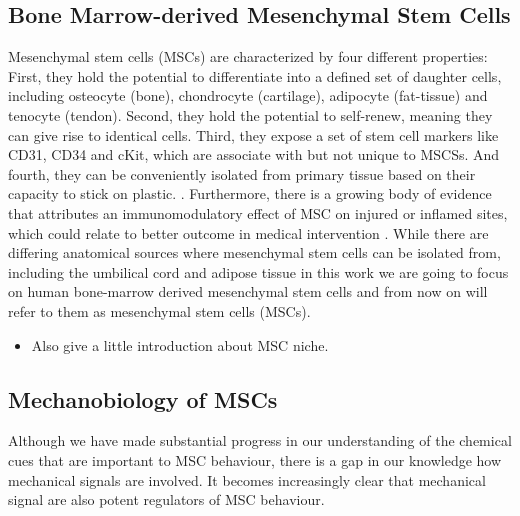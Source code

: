 \subsection{Bone Marrow-derived Mesenchymal Stem Cells}

Mesenchymal stem cells (MSCs) are characterized by four different properties: First, they hold the potential to differentiate into a defined set of daughter cells, including osteocyte (bone), chondrocyte (cartilage), adipocyte (fat-tissue) and tenocyte (tendon).\cite{Ng2008} Second, they hold the potential to self-renew, meaning they can give rise to identical cells. Third, they expose a set of stem cell markers like CD31, CD34 and cKit, which are associate with but not unique to MSCSs. \cite{Battula2009} And fourth, they can be conveniently isolated from primary tissue based on their capacity to stick on plastic. \cite{Buhring2007}. Furthermore, there is a growing body of evidence that attributes an immunomodulatory effect of MSC on injured or inflamed sites, which could relate to better outcome in medical intervention \cite{Caplan2011, Hass2011}.
While there are differing anatomical sources where mesenchymal stem cells can be isolated from, including the umbilical cord and adipose tissue \cite{Barlow2008, Hass2011} in this work we are going to focus on human bone-marrow derived mesenchymal stem cells and from now on will refer to them as mesenchymal stem cells (MSCs).

\begin{itemize}
	\item Also give a little introduction about MSC niche. 
\end{itemize}

\subsection{Mechanobiology of MSCs}

Although we have made substantial progress in our understanding of the chemical cues that are important to MSC behaviour, there is a gap in our knowledge how mechanical signals are involved. It becomes increasingly clear that mechanical signal are also potent regulators of MSC behaviour. 


